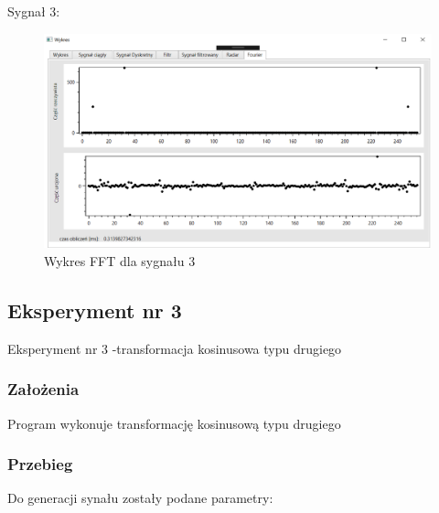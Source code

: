 \documentclass[12pt]{article}
\begin{document}
\newpage
Sygnał 3:
\begin{figure}[h!]
 \centering
 \includegraphics[width=12.3cm]{s18FFT.PNG}
 \vspace{-0.3cm}
 \caption{Wykres FFT dla sygnału 3}
 \label{Wykres dla wynikw eksperymentu pierwszego}
\end{figure}


\subsection{Eksperyment nr 3}

Eksperyment nr 3  -transformacja kosinusowa typu drugiego 
\subsubsection{Założenia}
Program wykonuje transformację kosinusową typu drugiego

\subsubsection{Przebieg}
Do generacji synału zostały podane parametry:
\end{document}
